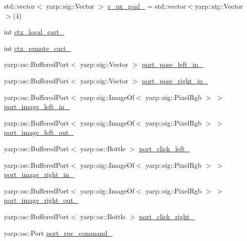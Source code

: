 \begin{DoxyCompactItemize}
\item 
std\+::vector$<$ yarp\+::sig\+::\+Vector $>$ \hyperlink{classVisualServoingServer_a831ffb606b1ff70d0475b645441f469d}{r\+\_\+px\+\_\+goal\+\_\+} = std\+::vector$<$yarp\+::sig\+::\+Vector$>$(4)
\item 
int \hyperlink{classVisualServoingServer_a85d6a488bf20eaeb155677a80f731614}{ctx\+\_\+local\+\_\+cart\+\_\+}
\item 
int \hyperlink{classVisualServoingServer_a815f9069588f590419cd8645afd3f017}{ctx\+\_\+remote\+\_\+cart\+\_\+}
\item 
yarp\+::os\+::\+Buffered\+Port$<$ yarp\+::sig\+::\+Vector $>$ \hyperlink{classVisualServoingServer_a4c250786d095b0e8a8f5546b2976a669}{port\+\_\+pose\+\_\+left\+\_\+in\+\_\+}
\item 
yarp\+::os\+::\+Buffered\+Port$<$ yarp\+::sig\+::\+Vector $>$ \hyperlink{classVisualServoingServer_a708ab93d60ae60ae28fbe7a9f1bffe29}{port\+\_\+pose\+\_\+right\+\_\+in\+\_\+}
\item 
yarp\+::os\+::\+Buffered\+Port$<$ yarp\+::sig\+::\+Image\+Of$<$ yarp\+::sig\+::\+Pixel\+Rgb $>$ $>$ \hyperlink{classVisualServoingServer_a0561904e7a2d8f680812f042eec3b2d8}{port\+\_\+image\+\_\+left\+\_\+in\+\_\+}
\item 
yarp\+::os\+::\+Buffered\+Port$<$ yarp\+::sig\+::\+Image\+Of$<$ yarp\+::sig\+::\+Pixel\+Rgb $>$ $>$ \hyperlink{classVisualServoingServer_ac8e9e8c8e3c0a412bd1dd464b58931bd}{port\+\_\+image\+\_\+left\+\_\+out\+\_\+}
\item 
yarp\+::os\+::\+Buffered\+Port$<$ yarp\+::os\+::\+Bottle $>$ \hyperlink{classVisualServoingServer_a46d59d98a68e0a88b810835c447241f6}{port\+\_\+click\+\_\+left\+\_\+}
\item 
yarp\+::os\+::\+Buffered\+Port$<$ yarp\+::sig\+::\+Image\+Of$<$ yarp\+::sig\+::\+Pixel\+Rgb $>$ $>$ \hyperlink{classVisualServoingServer_a776855ca4deb47cf1c739bde2e07bc8e}{port\+\_\+image\+\_\+right\+\_\+in\+\_\+}
\item 
yarp\+::os\+::\+Buffered\+Port$<$ yarp\+::sig\+::\+Image\+Of$<$ yarp\+::sig\+::\+Pixel\+Rgb $>$ $>$ \hyperlink{classVisualServoingServer_ab5c7a20d3e8545331970517c75d79f2a}{port\+\_\+image\+\_\+right\+\_\+out\+\_\+}
\item 
yarp\+::os\+::\+Buffered\+Port$<$ yarp\+::os\+::\+Bottle $>$ \hyperlink{classVisualServoingServer_a67701a55fce8ed1301417ecda99eff06}{port\+\_\+click\+\_\+right\+\_\+}
\item 
yarp\+::os\+::\+Port \hyperlink{classVisualServoingServer_af10ae1004d335193ab8bd23821a6007f}{port\+\_\+rpc\+\_\+command\+\_\+}

\end{DoxyCompactItemize}

